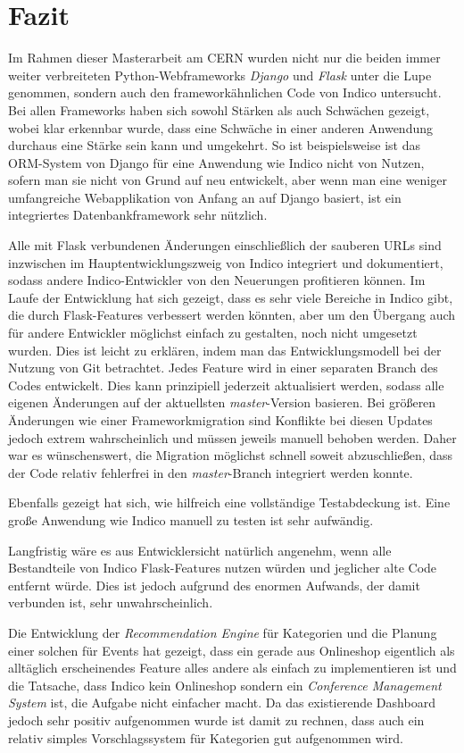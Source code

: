\chapter{Fazit}

Im Rahmen dieser Masterarbeit am CERN wurden nicht nur die beiden immer weiter verbreiteten
Python-Webframeworks \emph{Django} und \emph{Flask} unter die Lupe genommen, sondern auch den
frameworkähnlichen Code von Indico untersucht. Bei allen Frameworks haben sich sowohl Stärken als
auch Schwächen gezeigt, wobei klar erkennbar wurde, dass eine Schwäche in einer anderen Anwendung
durchaus eine Stärke sein kann und umgekehrt. So ist beispielsweise ist das ORM-System von Django
für eine Anwendung wie Indico nicht von Nutzen, sofern man sie nicht von Grund auf neu entwickelt,
aber wenn man eine weniger umfangreiche Webapplikation von Anfang an auf Django basiert, ist ein
integriertes Datenbankframework sehr nützlich.

Alle mit Flask verbundenen Änderungen einschließlich der sauberen URLs sind inzwischen im
Hauptentwicklungszweig von Indico integriert und dokumentiert, sodass andere Indico-Entwickler von
den Neuerungen profitieren können. Im Laufe der Entwicklung hat sich gezeigt, dass es sehr viele
Bereiche in Indico gibt, die durch Flask-Features verbessert werden könnten, aber um den Übergang
auch für andere Entwickler möglichst einfach zu gestalten, noch nicht umgesetzt wurden. Dies ist
leicht zu erklären, indem man das Entwicklungsmodell bei der Nutzung von Git betrachtet. Jedes
Feature wird in einer separaten Branch des Codes entwickelt. Dies kann prinzipiell jederzeit
aktualisiert werden, sodass alle eigenen Änderungen auf der aktuellsten \emph{master}-Version
basieren. Bei größeren Änderungen wie einer Frameworkmigration sind Konflikte bei diesen Updates
jedoch extrem wahrscheinlich und müssen jeweils manuell behoben werden. Daher war es wünschenswert,
die Migration möglichst schnell soweit abzuschließen, dass der Code relativ fehlerfrei in den
\emph{master}-Branch integriert werden konnte.

Ebenfalls gezeigt hat sich, wie hilfreich eine vollständige Testabdeckung ist. Eine große Anwendung
wie Indico manuell zu testen ist sehr aufwändig.

Langfristig wäre es aus Entwicklersicht natürlich angenehm, wenn alle Bestandteile von Indico
Flask-Features nutzen würden und jeglicher alte Code entfernt würde. Dies ist jedoch aufgrund des
enormen Aufwands, der damit verbunden ist, sehr unwahrscheinlich.

Die Entwicklung der \emph{Recommendation Engine} für Kategorien und die Planung einer solchen für
Events hat gezeigt, dass ein gerade aus Onlineshop eigentlich als alltäglich erscheinendes Feature
alles andere als einfach zu implementieren ist und die Tatsache, dass Indico kein Onlineshop sondern
ein \emph{Conference Management System} ist, die Aufgabe nicht einfacher macht. Da das existierende
Dashboard jedoch sehr positiv aufgenommen wurde ist damit zu rechnen, dass auch ein relativ simples
Vorschlagssystem für Kategorien gut aufgenommen wird.
